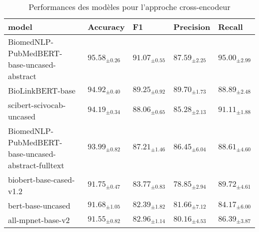 \begin{table}[!ht]
\caption{Performances des modèles pour l'approche cross-encodeur}
\label{tab:outcome-sim-cross-encoder-results}
\begin{tabular}{lllll}
\toprule
\textbf{model} & \textbf{Accuracy} & \textbf{F1} & \textbf{Precision} & \textbf{Recall} \\
\midrule
BiomedNLP-PubMedBERT-base-uncased-abstract & $95.58_{\pm0.26}$ & $91.07_{\pm0.55}$ & $87.59_{\pm2.25}$ & $95.00_{\pm2.99}$ \\
BioLinkBERT-base & $94.92_{\pm0.40}$ & $89.25_{\pm0.92}$ & $89.70_{\pm1.73}$ & $88.89_{\pm2.48}$ \\
scibert-scivocab-uncased & $94.19_{\pm0.34}$ & $88.06_{\pm0.65}$ & $85.28_{\pm2.13}$ & $91.11_{\pm1.88}$ \\
BiomedNLP-PubMedBERT-base-uncased-abstract-fulltext & $93.99_{\pm0.82}$ & $87.21_{\pm1.46}$ & $86.45_{\pm6.04}$ & $88.61_{\pm4.60}$ \\
biobert-base-cased-v1.2 & $91.75_{\pm0.47}$ & $83.77_{\pm0.83}$ & $78.85_{\pm2.94}$ & $89.72_{\pm4.61}$ \\
bert-base-uncased & $91.68_{\pm1.05}$ & $82.39_{\pm1.82}$ & $81.66_{\pm7.12}$ & $84.17_{\pm6.00}$ \\
all-mpnet-base-v2 & $91.55_{\pm0.82}$ & $82.96_{\pm1.14}$ & $80.16_{\pm4.53}$ & $86.39_{\pm3.87}$ \\
\bottomrule
\end{tabular}
\end{table}
